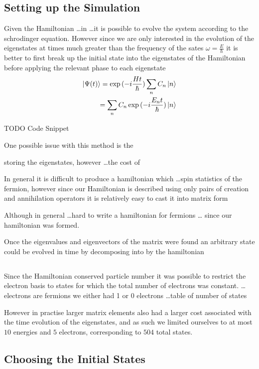 
\subsection{Setting up the Simulation}

Given the Hamiltonian \ldots in \ldots it
is possible to evolve the system
according to the schrodinger
equation. However since we
are only interested in the
evolution of the eigenstates
at times much greater than
the frequency of the sates
\(\omega = \frac{E}{\hbar}\)
it is better to first
break up the initial
state into the eigenstates
of the Hamiltonian
before applying the
relevant phase to
each eigenstate
\begin{align}
    \ket{\Psi(t)} = \exp{(-i\frac{Ht}{\hbar})} \sum_n C_n \ket{n} \\
    = \sum_n C_n \exp{(-i\frac{E_n t}{\hbar})} \ket{n}
\end{align}

TODO Code Snippet


One possible issue with this method
is the

storing the eigenstates, however
\ldots the cost of

In general it is difficult to produce
a hamiltonian which \ldots spin
statistics of the fermion,
however since our Hamiltonian is
described using only
pairs of creation and annihilation
operators it is relatively easy to
cast it into matrix form

Although in general \ldots hard to write
a hamiltonian for fermions \ldots
since our hamiltonian was formed.

Once the eigenvalues and eigenvectors of the
matrix were found an arbitrary state could
be evolved in time by decomposing into by the hamiltonian

\subsection{}
Since the Hamiltonian conserved particle number
it was possible to restrict the electron basis
to states for which the total number of electrons
was constant.
\ldots electrons are fermions we either had 1 or
0 electrons
\ldots table of number of states


However in practise larger matrix elements
also had a larger cost associated with
the time evolution of
the eigenstates, and as such we limited ourselves
to at most \(10\) energies and \(5\) electrons,
corresponding to \(504\) total states.

\subsection{Choosing the Initial States}

